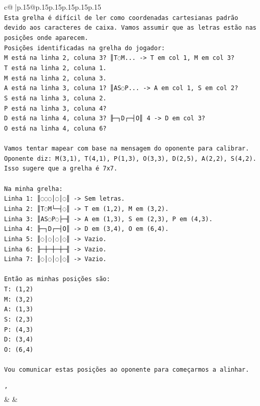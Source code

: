 \documentclass{article}
\begin{document}
{\begin{supertabular}{c@{$\;$}|p{.15\linewidth}@{}p{.15\linewidth}p{.15\linewidth}p{.15\linewidth}p{.15\linewidth}p{.15\linewidth}}
{{{\\ 
\texttt{Esta grelha é difícil de ler como coordenadas cartesianas padrão devido aos caracteres de caixa. Vamos assumir que as letras estão nas posições onde aparecem.} \\
\texttt{Posições identificadas na grelha do jogador:} \\
\texttt{M está na linha 2, coluna 3? ║T◌M... {-}> T em col 1, M em col 3?} \\
\texttt{T está na linha 2, coluna 1.} \\
\texttt{M está na linha 2, coluna 3.} \\
\texttt{A está na linha 3, coluna 1? ║AS◌P... {-}> A em col 1, S em col 2?} \\
\texttt{S está na linha 3, coluna 2.} \\
\texttt{P está na linha 3, coluna 4?} \\
\texttt{D está na linha 4, coluna 3? ╟─┐D┌─┤O║ 4 {-}> D em col 3?} \\
\texttt{O está na linha 4, coluna 6?} \\
\\ 
\texttt{Vamos tentar mapear com base na mensagem do oponente para calibrar.} \\
\texttt{Oponente diz: M(3,1), T(4,1), P(1,3), O(3,3), D(2,5), A(2,2), S(4,2).} \\
\texttt{Isso sugere que a grelha é 7x7.} \\
\\ 
\texttt{Na minha grelha:} \\
\texttt{Linha 1: ║◌◌◌│◌│◌║ {-}> Sem letras.} \\
\texttt{Linha 2: ║T◌M└─┤◌║ {-}> T em (1,2), M em (3,2).} \\
\texttt{Linha 3: ║AS◌P◌├─╢ {-}> A em (1,3), S em (2,3), P em (4,3).} \\
\texttt{Linha 4: ╟─┐D┌─┤O║ {-}> D em (3,4), O em (6,4).} \\
\texttt{Linha 5: ║◌│◌│◌│◌║ {-}> Vazio.} \\
\texttt{Linha 6: ╟─┼─┼─┼─╢ {-}> Vazio.} \\
\texttt{Linha 7: ║◌│◌│◌│◌║ {-}> Vazio.} \\
\\ 
\texttt{Então as minhas posições são:} \\
\texttt{T: (1,2)} \\
\texttt{M: (3,2)} \\
\texttt{A: (1,3)} \\
\texttt{S: (2,3)} \\
\texttt{P: (4,3)} \\
\texttt{D: (3,4)} \\
\texttt{O: (6,4)} \\
\\ 
\texttt{Vou comunicar estas posições ao oponente para começarmos a alinhar.} \\
\\ 
\texttt{'} \\
            }
        }
    }
    & & \\ \\


\end{supertabular}}
\end{document}
